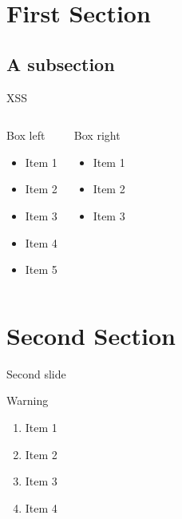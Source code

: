 %
%
%

\section{First Section}

\subsection{A subsection}

\begin{frame}{XSS}
	\begin{columns}[t]
		\begin{block}{Box left}
			\begin{itemize}
				\item Item 1
				\item Item 2
				\item Item 3
				\item Item 4
				\item Item 5
			\end{itemize}
		\end{block}
		\pause

		\begin{block}{Box right}
			\begin{itemize}
				\item Item 1
				\item Item 2
				\item Item 3
			\end{itemize}
		\end{block}
	\end{columns}
\end{frame}

\section{Second Section}

\begin{frame}{Second slide}
  \begin{alertblock}{Warning}
  \begin{enumerate}
    \item Item 1
    \item Item 2
    \item Item 3
    \item Item 4
  \end{enumerate}
  \end{alertblock}
\end{frame}
